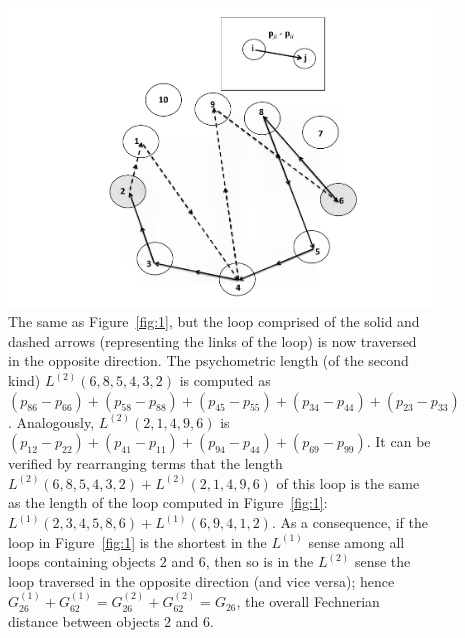 \documentclass[nojss]{jss}
\begin{document}
\begin{figure}[t!]
\begin{center}
\includegraphics[scale=1]{fig2.pdf}
\caption{The same as Figure~\ref{fig:1}, but the loop comprised of the solid
and dashed arrows (representing the links of the loop) is now traversed in the opposite direction. The
psychometric length (of the second kind) $L^{(2)}\left(6,8,5,4,3,2\right)$
is computed as $\left(p_{86}-p_{66}\right)+\left(p_{58}-p_{88}\right)+\left(p_{45}-p_{55}\right)+\left(p_{34}-p_{44}\right)+\left(p_{23}-p_{33}\right)$.
Analogously, $L^{(2)}\left(2,1,4,9,6\right)$ is $\left(p_{12}-p_{22}\right)+\left(p_{41}-p_{11}\right)+\left(p_{94}-p_{44}\right)+\left(p_{69}-p_{99}\right)$.
It can be verified by rearranging terms that the length
$L^{(2)}\left(6,8,5,4,3,2\right)+L^{(2)}\left(2,1,4,9,6\right)$
of this loop is the same as the length of the loop computed in Figure~\ref{fig:1}: 
$L^{(1)}\left(2,3,4,5,8,6\right)+L^{(1)}\left(6,9,4,1,2\right)$.
As a consequence, if the loop in Figure~\ref{fig:1} is the shortest in the $L^{(1)}$ sense among all
loops containing objects $2$ and $6$, then so is in the $L^{(2)}$ sense the loop traversed in
the opposite direction (and vice versa); hence $G_{26}^{(1)}+G_{62}^{(1)}=G_{26}^{(2)}+G_{62}^{(2)}=G_{26}$,
the overall Fechnerian distance between objects $2$ and $6$.}
\label{fig:2}
\end{center}
\end{figure}  
\end{document}

